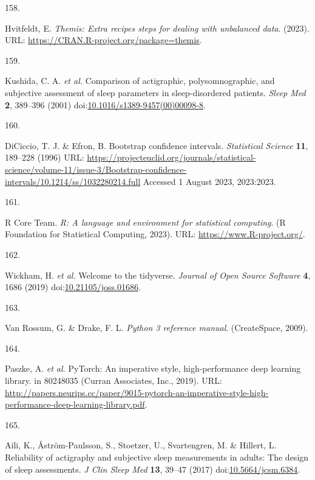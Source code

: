 \documentclass[
  10pt,
]{scrbook}
\newlength{\cslhangindent}
\newlength{\csllabelwidth}
\newlength{\cslentryspacingunit} %
\newenvironment{CSLReferences}[2] %
 {%
  \setlength{\parindent}{0pt}
  \ifodd #1
  \let\oldpar\par
  \def\par{\hangindent=\cslhangindent\oldpar}
  \fi
  \setlength{\parskip}{#2\cslentryspacingunit}
 }%
 {}
\newcommand{\CSLLeftMargin}[1]{\parbox[t]{\csllabelwidth}{#1}}
\newcommand{\CSLRightInline}[1]{\parbox[t]{\linewidth - \csllabelwidth}{#1}\break}
\let\originaltextbf\textbf
\renewcommand{\textbf}[1]{\textcolor{color1}{\textsf{\originaltextbf{#1}}}}
\begin{document}
\begin{CSLReferences}{0}{0}
\leavevmode{}%
\CSLLeftMargin{158. }%
\CSLRightInline{Hvitfeldt, E. \emph{Themis: Extra recipes steps for
dealing with unbalanced data}. (2023). URL:
\url{https://CRAN.R-project.org/package=themis}.}

\leavevmode{}%
\CSLLeftMargin{159. }%
\CSLRightInline{Kushida, C. A. \emph{et al.} Comparison of actigraphic,
polysomnographic, and subjective assessment of sleep parameters in
sleep-disordered patients. \emph{Sleep Med} \textbf{2}, 389--396 (2001)
doi:\href{https://doi.org/10.1016/s1389-9457(00)00098-8}{10.1016/s1389-9457(00)00098-8}.}

\leavevmode{}%
\CSLLeftMargin{160. }%
\CSLRightInline{DiCiccio, T. J. \& Efron, B. Bootstrap confidence
intervals. \emph{Statistical Science} \textbf{11}, 189--228 (1996) URL:
\url{https://projecteuclid.org/journals/statistical-science/volume-11/issue-3/Bootstrap-confidence-intervals/10.1214/ss/1032280214.full}
Accessed 1 August 2023, 2023:2023.}

\leavevmode{}%
\CSLLeftMargin{161. }%
\CSLRightInline{R Core Team. \emph{R: A language and environment for
statistical computing}. (R Foundation for Statistical Computing, 2023).
URL: \url{https://www.R-project.org/}.}

\leavevmode{}%
\CSLLeftMargin{162. }%
\CSLRightInline{Wickham, H. \emph{et al.} Welcome to the tidyverse.
\emph{Journal of Open Source Software} \textbf{4}, 1686 (2019)
doi:\href{https://doi.org/10.21105/joss.01686}{10.21105/joss.01686}.}

\leavevmode{}%
\CSLLeftMargin{163. }%
\CSLRightInline{Van Rossum, G. \& Drake, F. L. \emph{Python 3 reference
manual}. (CreateSpace, 2009).}

\leavevmode{}%
\CSLLeftMargin{164. }%
\CSLRightInline{Paszke, A. \emph{et al.} PyTorch: An imperative style,
high-performance deep learning library. in 80248035 (Curran Associates,
Inc., 2019). URL:
\url{http://papers.neurips.cc/paper/9015-pytorch-an-imperative-style-high-performance-deep-learning-library.pdf}.}

\leavevmode{}%
\CSLLeftMargin{165. }%
\CSLRightInline{Aili, K., Åström-Paulsson, S., Stoetzer, U.,
Svartengren, M. \& Hillert, L. Reliability of actigraphy and subjective
sleep measurements in adults: The design of sleep assessments. \emph{J
Clin Sleep Med} \textbf{13}, 39--47 (2017)
doi:\href{https://doi.org/10.5664/jcsm.6384}{10.5664/jcsm.6384}.}


\end{CSLReferences}
\end{document}
